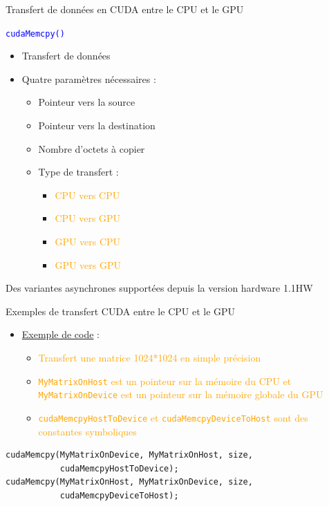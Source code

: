 \documentclass[handout,francais]{beamer}
\begin{document}
\begin{frame}{Transfert de données en CUDA entre le CPU et le GPU}

\textcolor{blue}{\Large\tt cudaMemcpy()}
\begin{itemize}
\item Transfert de données
\item Quatre paramètres nécessaires :
  \begin{itemize}
  \item Pointeur vers la source
  \item Pointeur vers la destination
  \item Nombre d'octets à copier
  \item Type de transfert :
    \begin{itemize}
    \item \textcolor{orange}{CPU vers CPU}
    \item \textcolor{orange}{CPU vers GPU}
    \item \textcolor{orange}{GPU vers CPU}
    \item \textcolor{orange}{GPU vers GPU}
    \end{itemize}
  \end{itemize}
\end{itemize}
Des variantes asynchrones supportées depuis la version hardware 1.1HW
\end{frame}

\begin{frame}[containsverbatim]{Exemples de transfert CUDA entre le CPU et le GPU}
\begin{itemize}
\item \underline{Exemple de code} :
  \begin{itemize}
  \item \textcolor{orange}{Transfert une matrice 1024*1024 en simple précision}
  \item \textcolor{orange}{\texttt{MyMatrixOnHost} est un pointeur sur la mémoire du CPU
      et \texttt{MyMatrixOnDevice} est un pointeur sur la mémoire globale du GPU}
  \item \textcolor{orange}{\texttt{cudaMemcpyHostToDevice} et
      \texttt{cudaMemcpyDeviceToHost} sont des constantes symboliques}
  \end{itemize}
\end{itemize}
\begin{lstlisting}
cudaMemcpy(MyMatrixOnDevice, MyMatrixOnHost, size,
           cudaMemcpyHostToDevice);
cudaMemcpy(MyMatrixOnHost, MyMatrixOnDevice, size,
           cudaMemcpyDeviceToHost);
\end{lstlisting}
\end{frame}
\end{document}
